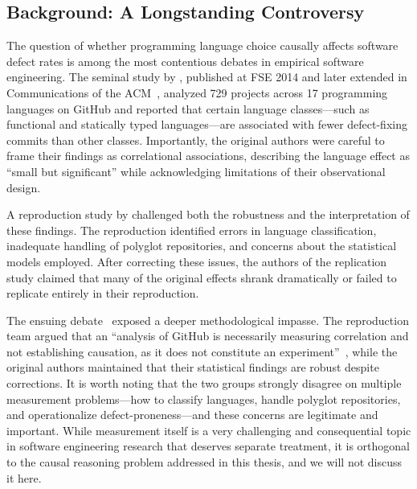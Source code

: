 \subsection{Background: A Longstanding Controversy}

The question of whether programming language choice causally affects software defect rates is among the most contentious debates in empirical software engineering.
The seminal study by \citet{DBLP:conf/sigsoft/RayPFD14}, published at FSE 2014 and later extended in Communications of the ACM~\cite{DBLP:journals/cacm/RayPDF17}, analyzed 729 projects across 17 programming languages on GitHub and reported that certain language classes---such as functional and statically typed languages---are associated with fewer defect-fixing commits than other classes.
Importantly, the original authors were careful to frame their findings as correlational associations, describing the language effect as ``small but significant'' while acknowledging limitations of their observational design.

A reproduction study by \citet{DBLP:journals/toplas/BergerHMVV19} challenged both the robustness and the interpretation of these findings.
The reproduction identified errors in language classification, inadequate handling of polyglot repositories, and concerns about the statistical models employed.
After correcting these issues, the authors of the replication study claimed that many of the original effects shrank dramatically or failed to replicate entirely in their reproduction.

The ensuing debate~\cite{DBLP:journals/corr/abs-1911-07393, DBLP:journals/corr/abs-1911-11894} exposed a deeper methodological impasse.
The reproduction team argued that an ``analysis of GitHub is necessarily measuring correlation and not establishing causation, as it does not constitute an experiment''~\cite{DBLP:journals/corr/abs-1911-11894}, while the original authors maintained that their statistical findings are robust despite corrections.
It is worth noting that the two groups strongly disagree on multiple measurement problems---how to classify languages, handle polyglot repositories, and operationalize defect-proneness---and these concerns are legitimate and important.
While measurement itself is a very challenging and consequential topic in software engineering research that deserves separate treatment, it is orthogonal to the causal reasoning problem addressed in this thesis, and we will not discuss it here.

